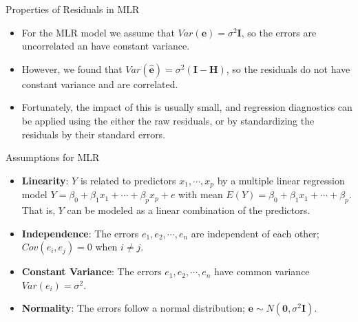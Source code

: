 \documentclass[10pt]{beamer}\usepackage[]{graphicx}\usepackage[]{color}
\begin{document}
\begin{frame}{Properties of Residuals in MLR}
\begin{itemize}
\item For the MLR model we assume that $Var(\bm{e}) = \sigma^2 \bm{I}$, so the errors are uncorrelated an have constant variance.
\vspace{10pt}
\item However, we found that $Var(\hat{\bm{e}}) = \sigma^2 (\bm{I}-\bm{H})$, so the residuals do not have constant variance and are correlated.
\vspace{10pt}
\item Fortunately, the impact of this is usually small, and regression diagnostics can be applied using the either the raw residuals, or by standardizing the residuals by their standard errors. 
\end{itemize}
\end{frame}

\begin{frame}{Assumptions for MLR}
\begin{itemize}
\item \textbf{Linearity}: $Y$ is related to predictors $x_1, \cdots, x_p$ by a multiple linear regression model $Y = \beta_0 + \beta_1 x_1 + \cdots + \beta_p x_p + e$ with mean $E(Y) = \beta_0 + \beta_1 x_1 + \cdots + \beta_p$.  That is, $Y$ can be modeled as a linear combination of the predictors.\\
\vspace{5pt}
\item \textbf{Independence}:  The errors $e_1, e_2, \cdots, e_n$ are independent of each other; $Cov(e_i, e_j) = 0$ when $i \neq j$.\\
\vspace{5pt}
\item \textbf{Constant Variance}:  The errors $e_1, e_2, \cdots, e_n$ have common variance $Var(e_i) = \sigma^2$.\\
\vspace{5pt}
\item \textbf{Normality}:  The errors follow a normal distribution; $\bm{e} \sim N(\bm{0},\sigma^2 \bm{I})$.
\end{itemize}
\end{frame}
\end{document}
